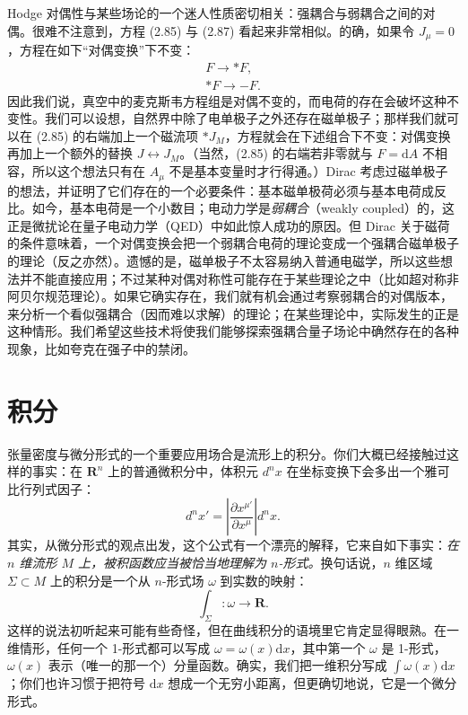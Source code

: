 Hodge 对偶性与某些场论的一个迷人性质密切相关：强耦合与弱耦合之间的对偶。很难不注意到，方程 (2.85) 与 (2.87) 看起来非常相似。的确，如果令 $J_{\mu}=0$，方程在如下“对偶变换”下不变：
\begin{gather*}
F\to *F,\\
*F\to -F. \tag{2.88}
\end{gather*}
因此我们说，真空中的麦克斯韦方程组是对偶不变的，而电荷的存在会破坏这种不变性。我们可以设想，自然界中除了电单极子之外还存在磁单极子；那样我们就可以在 (2.85) 的右端加上一个磁流项 $*J_{M}$，方程就会在下述组合下不变：对偶变换再加上一个额外的替换 $J\leftrightarrow J_{M}$。（当然，(2.85) 的右端若非零就与 $F=\mathrm{d}A$ 不相容，所以这个想法只有在 $A_{\mu}$ 不是基本变量时才行得通。）Dirac 考虑过磁单极子的想法，并证明了它们存在的一个必要条件：基本磁单极荷必须与基本电荷成反比。如今，基本电荷是一个小数目；电动力学是\emph{弱耦合}（weakly coupled）的，这正是微扰论在量子电动力学（QED）中如此惊人成功的原因。但 Dirac 关于磁荷的条件意味着，一个对偶变换会把一个弱耦合电荷的理论变成一个强耦合磁单极子的理论（反之亦然）。遗憾的是，磁单极子不太容易纳入普通电磁学，所以这些想法并不能直接应用；不过某种对偶对称性可能存在于某些理论之中（比如超对称非阿贝尔规范理论）。如果它确实存在，我们就有机会通过考察弱耦合的对偶版本，来分析一个看似强耦合（因而难以求解）的理论；在某些理论中，实际发生的正是这种情形。我们希望这些技术将使我们能够探索强耦合量子场论中确然存在的各种现象，比如夸克在强子中的禁闭。

\section{积分}

张量密度与微分形式的一个重要应用场合是流形上的积分。你们大概已经接触过这样的事实：在 $\mathbf{R}^{n}$ 上的普通微积分中，体积元 $d^{n}x$ 在坐标变换下会多出一个雅可比行列式因子：
\begin{equation*}
d^{n}x'=\left|\frac{\partial x^{\mu'}}{\partial x^{\mu}}\right|d^{n}x. \tag{2.89}
\end{equation*}
其实，从微分形式的观点出发，这个公式有一个漂亮的解释，它来自如下事实：\emph{在 $n$ 维流形 $M$ 上，被积函数应当被恰当地理解为 $n$-形式。}换句话说，$n$ 维区域 $\Sigma\subset M$ 上的积分是一个从 $n$-形式场 $\omega$ 到实数的映射：
\begin{equation*}
\int_{\Sigma}:\omega\to\mathbf{R}. \tag{2.90}
\end{equation*}
这样的说法初听起来可能有些奇怪，但在曲线积分的语境里它肯定显得眼熟。在一维情形，任何一个 1-形式都可以写成 $\omega=\omega(x)\mathrm{d}x$，其中第一个 $\omega$ 是 1-形式，$\omega(x)$ 表示（唯一的那一个）分量函数。确实，我们把一维积分写成 $\int\omega(x)\mathrm{d}x$；你们也许习惯于把符号 $\mathrm{d}x$ 想成一个无穷小距离，但更确切地说，它是一个微分形式。

